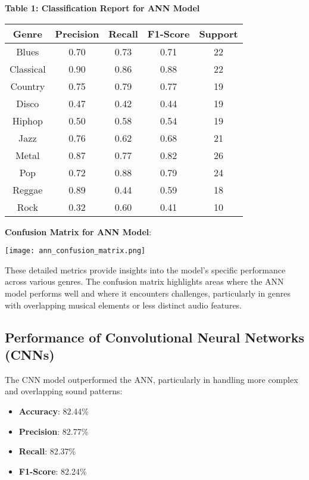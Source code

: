 \documentclass[lettersize,journal]{IEEEtran}
\begin{document}
\textbf{Table 1: Classification Report for ANN Model}
\begin{center}
\begin{tabular}{|c|c|c|c|c|}
\hline
Genre & Precision & Recall & F1-Score & Support \\
\hline
Blues & 0.70 & 0.73 & 0.71 & 22 \\
Classical & 0.90 & 0.86 & 0.88 & 22 \\
Country & 0.75 & 0.79 & 0.77 & 19 \\
Disco & 0.47 & 0.42 & 0.44 & 19 \\
Hiphop & 0.50 & 0.58 & 0.54 & 19 \\
Jazz & 0.76 & 0.62 & 0.68 & 21 \\
Metal & 0.87 & 0.77 & 0.82 & 26 \\
Pop & 0.72 & 0.88 & 0.79 & 24 \\
Reggae & 0.89 & 0.44 & 0.59 & 18 \\
Rock & 0.32 & 0.60 & 0.41 & 10 \\
\hline
\end{tabular}
\end{center}

\textbf{Confusion Matrix for ANN Model}:
\begin{center}
\texttt{[image: ann\_confusion\_matrix.png]}
\end{center}

These detailed metrics provide insights into the model's specific performance across various genres. The confusion matrix highlights areas where the ANN model performs well and where it encounters challenges, particularly in genres with overlapping musical elements or less distinct audio features.

\subsection{Performance of Convolutional Neural Networks (CNNs)}

The CNN model outperformed the ANN, particularly in handling more complex and overlapping sound patterns:
\begin{itemize}
    \item \textbf{Accuracy}: 82.44\%
    \item \textbf{Precision}: 82.77\%
    \item \textbf{Recall}: 82.37\%
    \item \textbf{F1-Score}: 82.24\%
\end{itemize}
\end{document}
